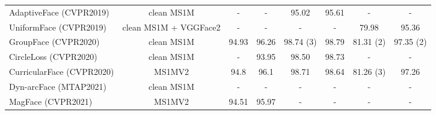 \documentclass[letterpaper, 10 pt, conference]{ieeeconf}  \usepackage{times}
\begin{document}
\begin{table*}[ht!]
{\begin{tabular}{|l|c|c|c|c|c|c|c|}
AdaptiveFace\cite{adaptiveface} (CVPR2019)           & clean MS1M    \cite{DBLP:conf/eccv/GuoZHHG16,DBLP:journals/tifs/WuHST18}                                                               & -              & -              & 95.02          & 95.61                                                         & -              & -                                                              \\
UniformFace\cite{uniformface} (CVPR2019)             & clean MS1M \cite{DBLP:conf/eccv/GuoZHHG16,deng2019arcface}   + VGGFace2  \cite{DBLP:conf/fgr/CaoSXPZ18}                                                                        & -              & -              & -              & -                                                              & 79.98          & 95.36                                                          \\
GroupFace\cite{groupface} (CVPR2020)                &  clean MS1M \cite{DBLP:conf/eccv/GuoZHHG16,deng2019arcface}                                                                      & 94.93          & 96.26          & 98.74 (3)          & 98.79                                                          & 81.31 (2)         &  97.35 (2)                                              \\
CircleLoss\cite{cricleloss} (CVPR2020)              & clean MS1M \cite{DBLP:conf/eccv/GuoZHHG16,cricleloss}                                                          & -              &  93.95          & 98.50          &  98.73                                                          & -              & -                                                              \\
CurricularFace\cite{curricularface} (CVPR2020)          & MS1MV2 \cite{DBLP:conf/eccv/GuoZHHG16,deng2019arcface}                                                                     & 94.8           & 96.1           & 98.71          & 98.64                                                          & 81.26 (3)         & 97.26                                                          \\
Dyn-arcFace \cite{dynarc} (MTAP2021)            & clean MS1M  \cite{DBLP:conf/eccv/GuoZHHG16,deng2019arcface}                                                                   & -              & -              & -              & -                                                              & -              & -                                                              \\
MagFace\cite{magface} (CVPR2021)                 & MS1MV2   \cite{DBLP:conf/eccv/GuoZHHG16,deng2019arcface}                                                                    & 94.51          & 95.97          & -              & -                                                              & -              & -                                                              \\

\end{tabular}}
\end{table*}
\end{document}
